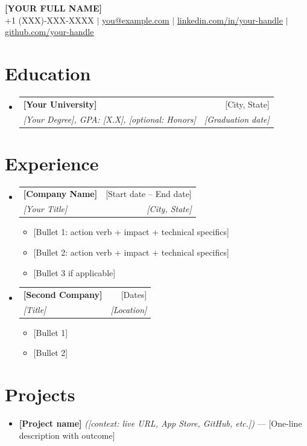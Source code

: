 \documentclass[letterpaper,11pt]{article}
\makeatletter
\newcommand{\resumeItem}[1]{
  \item\small{
    {#1 \vspace{0pt}}
  }
}
\newcommand{\resumeSubheading}[4]{
  \vspace{-1pt}\item
    \begin{tabular*}{0.97\textwidth}[t]{l@{\extracolsep{\fill}}r}
      \textbf{#1} & #2 \\
      \textit{\small#3} & \textit{\small #4} \\
    \end{tabular*}\vspace{-5pt}
}
\newcommand{\resumeSubHeadingListStart}{\begin{itemize}[leftmargin=0.15in, label={}]}
\newcommand{\resumeSubHeadingListEnd}{\end{itemize}}
\newcommand{\resumeItemListStart}{\begin{itemize}[itemsep=3pt, topsep=4pt, parsep=0pt, leftmargin=*]}
\newcommand{\resumeItemListEnd}{\end{itemize}\vspace{-3pt}}
\makeatother
\begin{document}
\begin{center}
    \textbf{\Huge \scshape [YOUR FULL NAME]} \\ \vspace{1pt}
    \small +1 (XXX)-XXX-XXXX $|$ \href{mailto:you@example.com}{\underline{you@example.com}} $|$
    \href{https://linkedin.com/in/your-handle}{\underline{linkedin.com/in/your-handle}} $|$
    \href{https://github.com/your-handle}{\underline{github.com/your-handle}}
\end{center}

\section{Education}
  \resumeSubHeadingListStart
    \resumeSubheading
      {[Your University]}{[City, State]}
      {[Your Degree], GPA: [X.X], [optional: Honors]}{[Graduation date]}
  \resumeSubHeadingListEnd

\section{Experience}
  \resumeSubHeadingListStart

    \resumeSubheading
      {[Company Name]}{[Start date -- End date]}
      {[Your Title]}{[City, State]}
      \resumeItemListStart
        \resumeItem{[Bullet 1: action verb + impact + technical specifics]}
        \resumeItem{[Bullet 2: action verb + impact + technical specifics]}
        \resumeItem{[Bullet 3 if applicable]}
      \resumeItemListEnd

    \resumeSubheading
      {[Second Company]}{[Dates]}
      {[Title]}{[Location]}
      \resumeItemListStart
        \resumeItem{[Bullet 1]}
        \resumeItem{[Bullet 2]}
      \resumeItemListEnd

  \resumeSubHeadingListEnd

\section{Projects}
  \resumeSubHeadingListStart
    \resumeItem{\textbf{[Project name]} \textit{([context: live URL, App Store, GitHub, etc.])} --- [One-line description with outcome]}
  \resumeSubHeadingListEnd
\end{document}
